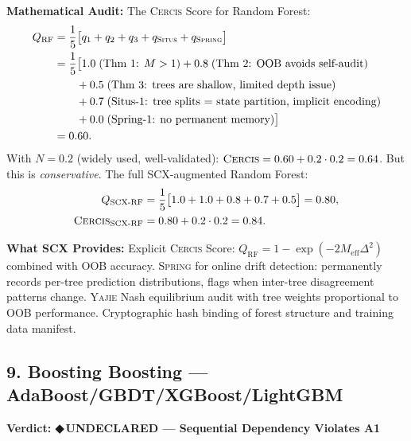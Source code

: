 \documentclass[12pt,a4paper]{article}
\theoremstyle{definition}
\newcommand{\guilty}{{\color{guiltycolor}\textbf{◆\,UNDECLARED}}}
\newcommand{\Situs}{\textsc{Situs}}
\newcommand{\Yajie}{\textsc{Yajie}}
\newcommand{\Spring}{\textsc{Spring}}
\newcommand{\Cercis}{\textsc{Cercis}}
\newcommand{\auditHeader}[1]{\medskip\noindent\textbf{\large #1}\medskip}
\newcommand{\whatMissing}{\noindent\textbf{What SCX Provides:} }
\newcommand{\mathAudit}{\noindent\textbf{Mathematical Audit:} }
\begin{document}
\mathAudit{} The \Cercis{} Score for Random Forest:
\begin{align}
    Q_{\text{RF}} &= \frac{1}{5}\bigl[q_1 + q_2 + q_3 + q_{\Situs} + q_{\Spring}\bigr] \\
    &= \frac{1}{5}\bigl[1.0\;(\text{Thm 1: } M>1) + 0.8\;(\text{Thm 2: OOB avoids self-audit}) \\
    &\qquad + 0.5\;(\text{Thm 3: trees are shallow, limited depth issue}) \\
    &\qquad + 0.7\;(\text{Situs-1: tree splits = state partition, implicit encoding}) \\
    &\qquad + 0.0\;(\text{Spring-1: no permanent memory})\bigr] \\
    &= 0.60.
\end{align}
With $N=0.2$ (widely used, well-validated): $\Cercis = 0.60 + 0.2 \cdot 0.2 = 0.64$. But this is \textit{conservative}. The full SCX-augmented Random Forest:
\begin{align}
    Q_{\text{SCX-RF}} &= \frac{1}{5}\bigl[1.0 + 1.0 + 0.8 + 0.7 + 0.5\bigr] = 0.80, \\
    \Cercis_{\text{SCX-RF}} &= 0.80 + 0.2 \cdot 0.2 = 0.84.
\end{align}

\whatMissing{} Explicit \Cercis{} Score: $Q_{\text{RF}} = 1 - \exp(-2M_{\text{eff}}\Delta^2)$ combined with OOB accuracy. \Spring{} for online drift detection: permanently records per-tree prediction distributions, flags when inter-tree disagreement patterns change. \Yajie{} Nash equilibrium audit with tree weights proportional to OOB performance. Cryptographic hash binding of forest structure and training data manifest.

\subsection{9. Boosting Boosting --- AdaBoost/GBDT/XGBoost/LightGBM}

\auditHeader{Verdict: \guilty{} — Sequential Dependency Violates A1}
\end{document}
